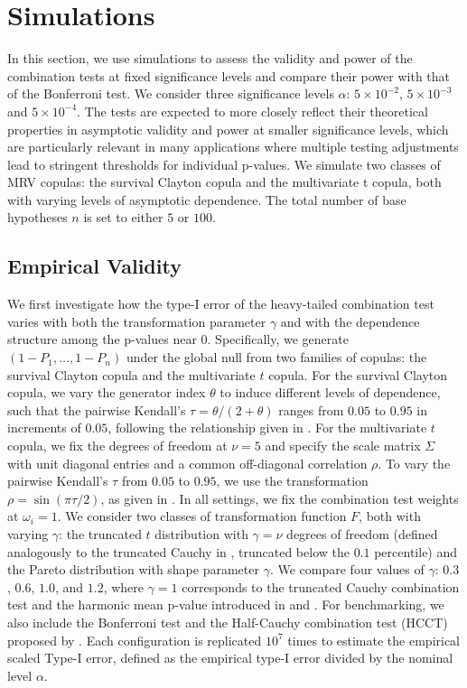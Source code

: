 \documentclass[12pt]{article}
\theoremstyle{plain}
\theoremstyle{plain}
\theoremstyle{definition}
\begin{document}
\section{Simulations}
\label{sec:simulations}

In this section, we use simulations to assess the validity and power of the combination tests at fixed significance levels and compare their power with that of the Bonferroni test. We consider three significance levels $\alpha$: $5\times 10^{-2}$, $5\times 10^{-3}$ and $5\times10^{-4}$. 
The tests are expected to more closely reflect their theoretical properties in asymptotic validity and power at smaller significance levels, which are particularly relevant in many applications where multiple testing adjustments lead to stringent thresholds for individual p-values. We simulate two classes of MRV copulas: the survival Clayton copula and the multivariate 
t copula, both with varying levels of asymptotic dependence. The total number of base hypotheses $n$ is set to either $5$ or $100$.


\subsection{Empirical Validity}
\label{subsec:empirical-validity}
We first investigate how the type-I error of the heavy-tailed combination test varies with both the transformation parameter $\gamma$ and with the dependence structure among the p-values near $0$. Specifically, we generate $(1-P_1,\dots, 1-P_n)$ under the global null from two families of copulas: the survival Clayton copula and the multivariate $t$ copula. 
For the survival Clayton copula, we vary the generator index $\theta$ to induce different levels of dependence, such that the pairwise Kendall’s $\tau = \theta / (2 + \theta)$ ranges from $0.05$ to $0.95$ in increments of $0.05$, following the relationship given in \citet[Table 7.5]{mcneil2015quantitative}. For the multivariate $t$ copula, we fix the degrees of freedom at $\nu = 5$ and specify the scale matrix $\Sigma$ with unit diagonal entries and a common off-diagonal correlation $\rho$. To vary the pairwise Kendall’s $\tau$ from $0.05$ to $0.95$, we use the transformation $\rho = \sin(\pi \tau / 2)$, as given in \citet[Section 3.1]{demarta2005t}.
In all settings, we fix the combination test weights at $\omega_i = 1$. 
We consider two classes of transformation function $F$, both with varying $\gamma$: 
the truncated $t$ distribution with $\gamma =\nu$ degrees of freedom (defined analogously to the truncated Cauchy in , truncated below the $0.1$ percentile) and the Pareto distribution with shape parameter $\gamma$. 
We compare four values of $\gamma$: $0.3$, $0.6$, $1.0$, and $1.2$, where $\gamma = 1$ corresponds to the truncated Cauchy combination test and the harmonic mean p-value introduced in  and . For benchmarking, we also include the Bonferroni test and the Half-Cauchy combination test (HCCT) proposed by \citet{liu2025heavily}. Each configuration is replicated $10^7$ times to estimate the empirical scaled Type-I error, defined as the empirical type-I error divided by the nominal level  $\alpha$.
\end{document}
